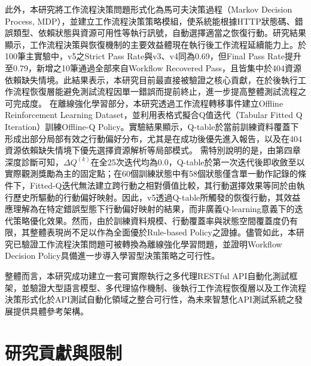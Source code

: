 \begin{ZhChapter}
\text 此外，本研究將工作流程決策問題形式化為馬可夫決策過程（Markov Decision Process, MDP），並建立工作流程決策策略模組，使系統能根據HTTP狀態碼、錯誤類型、依賴狀態與資源可用性等執行訊號，自動選擇適當之恢復行動。研究結果顯示，工作流程決策與恢復機制的主要效益體現在執行後工作流程延續能力上。於100筆主實驗中，v5之Strict Pass Rate與v3、v4同為0.69，但Final Pass Rate提升至0.79，新增之10筆通過全部來自Workflow Recovered Pass，且皆集中於404資源依賴缺失情境。此結果表示，本研究目前最直接被驗證之核心貢獻，在於後執行工作流程恢復層能避免測試流程因單一錯誤而提前終止，進一步提高整體測試流程之可完成度。
\text 在離線強化學習部分，本研究透過工作流程轉移事件建立Offline Reinforcement Learning Dataset，並利用表格式擬合Q值迭代（Tabular Fitted Q Iteration）訓練Offline-Q Policy。實驗結果顯示，Q-table於當前訓練資料覆蓋下形成出部分局部有效之行動偏好分布，尤其是在成功後優先進入報告，以及在404資源依賴缺失情境下優先選擇資源解析等局部模式。
\text 需特別說明的是，由第四章深度診斷可知，$\Delta Q^{(k)}$在全25次迭代均為0.0，Q-table於第一次迭代後即收斂至以實際觀測獎勵為主的固定點；在60個訓練狀態中有58個狀態僅含單一動作記錄的條件下，Fitted-Q迭代無法建立跨行動之相對價值比較，其行動選擇效果等同於由執行歷史所驅動的行動偏好映射。因此，v5透過Q-table所觸發的恢復行動，其效益應理解為在特定錯誤型態下行動偏好映射的結果，而非廣義Q-learning意義下的迭代策略優化效果。然而，由於訓練資料規模、行動覆蓋率與狀態空間覆蓋度仍有限，其整體表現尚不足以作為全面優於Rule-based Policy之證據。儘管如此，本研究已驗證工作流程決策問題可被轉換為離線強化學習問題，並證明Workflow Decision Policy具備進一步導入學習型決策策略之可行性。

\text 整體而言，本研究成功建立一套可實際執行之多代理RESTful API自動化測試框架，並驗證大型語言模型、多代理協作機制、後執行工作流程恢復層以及工作流程決策形式化於API測試自動化領域之整合可行性，為未來智慧化API測試系統之發展提供具體參考架構。

\section{研究貢獻與限制}


\end{ZhChapter}
